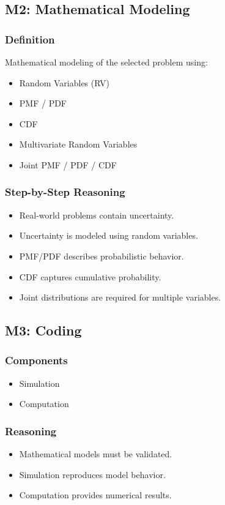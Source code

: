 \documentclass[12pt]{article}
\begin{document}
\subsection{M2: Mathematical Modeling}

\subsubsection{Definition}
Mathematical modeling of the selected problem using:
\begin{itemize}
    \item Random Variables (RV)
    \item PMF / PDF
    \item CDF
    \item Multivariate Random Variables
    \item Joint PMF / PDF / CDF
\end{itemize}

\subsubsection{Step-by-Step Reasoning}
\begin{itemize}
    \item Real-world problems contain uncertainty.
    \item Uncertainty is modeled using random variables.
    \item PMF/PDF describes probabilistic behavior.
    \item CDF captures cumulative probability.
    \item Joint distributions are required for multiple variables.
\end{itemize}

\subsection{M3: Coding}

\subsubsection{Components}
\begin{itemize}
    \item Simulation
    \item Computation
\end{itemize}

\subsubsection{Reasoning}
\begin{itemize}
    \item Mathematical models must be validated.
    \item Simulation reproduces model behavior.
    \item Computation provides numerical results.
\end{itemize}
\end{document}
